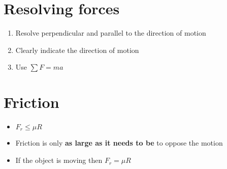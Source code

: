 \section{Resolving forces}
\begin{enumerate}
    \item Resolve perpendicular and parallel to the direction of motion
    \item Clearly indicate the direction of motion
    \item Use $\sum F = ma$
\end{enumerate}

\section{Friction}
\begin{itemize}
    \item $F_r \leq \mu R$
    \item Friction is only \textbf{as large as it needs to be} to oppose the motion
    \item If the object is moving then $F_r = \mu R$
\end{itemize}


